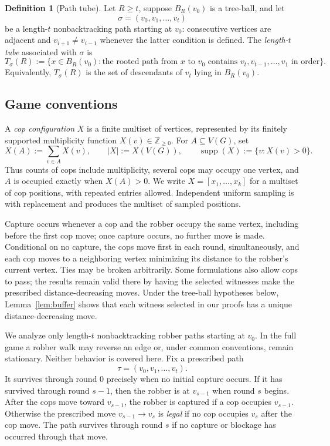 \documentclass[11pt]{amsart}
\theoremstyle{definition}
\newtheorem{definition}[theorem]{Definition}
\DeclareMathOperator{\supp}{supp}
\begin{document}
\begin{definition}[Path tube]
\label{def:tube}
Let $R\geq t$, suppose $B_R(v_0)$ is a tree-ball, and let
\[
\sigma=(v_0,v_1,\ldots,v_t)
\]
be a length-$t$ nonbacktracking path starting at $v_0$: consecutive vertices are adjacent and $v_{i+1}\neq v_{i-1}$ whenever the latter condition is defined. The \emph{length-$t$ tube} associated with $\sigma$ is
\[
T_\sigma(R):=\{x\in B_R(v_0):\text{the rooted path from $x$ to $v_0$ contains $v_t,v_{t-1},\ldots,v_1$ in order}\}.
\]
Equivalently, $T_\sigma(R)$ is the set of descendants of $v_t$ lying in $B_R(v_0)$.
\end{definition}

\subsection{Game conventions}

A \emph{cop configuration} $X$ is a finite multiset of vertices, represented by its finitely supported multiplicity function $X(v)\in\mathbb Z_{\geq0}$. For $A\subseteq V(G)$, set
\[
X(A):=\sum_{v\in A}X(v),
\qquad
|X|:=X(V(G)),
\qquad
\supp(X):=\{v:X(v)>0\}.
\]
Thus counts of cops include multiplicity, several cops may occupy one vertex, and $A$ is occupied exactly when $X(A)>0$. We write $X=[x_1,\ldots,x_k]$ for a multiset of cop positions, with repeated entries allowed. Independent uniform sampling is with replacement and produces the multiset of sampled positions.

Capture occurs whenever a cop and the robber occupy the same vertex, including before the first cop move; once capture occurs, no further move is made. Conditional on no capture, the cops move first in each round, simultaneously, and each cop moves to a neighboring vertex minimizing its distance to the robber's current vertex. Ties may be broken arbitrarily. Some formulations also allow cops to pass; the results remain valid there by having the selected witnesses make the prescribed distance-decreasing moves. Under the tree-ball hypotheses below, Lemma~\ref{lem:buffer} shows that each witness selected in our proofs has a unique distance-decreasing move.

We analyze only length-$t$ nonbacktracking robber paths starting at $v_0$. In the full game a robber walk may reverse an edge or, under common conventions, remain stationary. Neither behavior is covered here. Fix a prescribed path
\[
\tau=(v_0,v_1,\ldots,v_t).
\]
It survives through round $0$ precisely when no initial capture occurs. If it has survived through round $s-1$, then the robber is at $v_{s-1}$ when round $s$ begins. After the cops move toward $v_{s-1}$, the robber is captured if a cop occupies $v_{s-1}$. Otherwise the prescribed move $v_{s-1}\to v_s$ is \emph{legal} if no cop occupies $v_s$ after the cop move. The path survives through round $s$ if no capture or blockage has occurred through that move.
\end{document}
